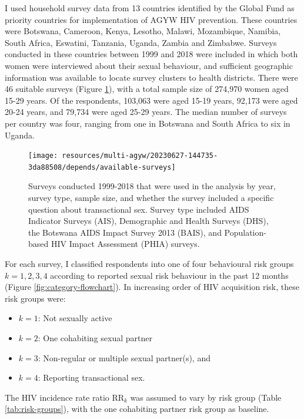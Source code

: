 \documentclass[a4paper, nobind]{templates/ociamthesis}
\providecommand{\tightlist}{%
  \setlength{\itemsep}{0pt}\setlength{\parskip}{0pt}}
\begin{document}
I used household survey data from 13 countries identified by the Global Fund \autocite{global2018measurement} as priority countries for implementation of AGYW HIV prevention.
These countries were Botswana, Cameroon, Kenya, Lesotho, Malawi, Mozambique, Namibia, South Africa, Eswatini, Tanzania, Uganda, Zambia and Zimbabwe.
Surveys conducted in these countries between 1999 and 2018 were included in which both women were interviewed about their sexual behaviour, and sufficient geographic information was available to locate survey clusters to health districts.
There were 46 suitable surveys (Figure \ref{fig:available-surveys}), with a total sample size of 274,970 women aged 15-29 years.
Of the respondents, 103,063 were aged 15-19 years, 92,173 were aged 20-24 years, and 79,734 were aged 25-29 years.
The median number of surveys per country was four, ranging from one in Botswana and South Africa to six in Uganda.



\begin{figure}
\texttt{[image: resources/multi-agyw/20230627-144735-3da88508/depends/available-surveys]} \caption{Surveys conducted 1999-2018 that were used in the analysis by year, survey type, sample size, and whether the survey included a specific question about transactional sex. Survey type included AIDS Indicator Surveys (AIS), Demographic and Health Surveys (DHS), the Botswana AIDS Impact Survey 2013 (BAIS), and Population-based HIV Impact Assessment (PHIA) surveys.}\label{fig:available-surveys}
\end{figure}

For each survey, I classified respondents into one of four behavioural risk groups \(k = 1, 2, 3, 4\) according to reported sexual risk behaviour in the past 12 months (Figure \ref{fig:category-flowchart}).
In increasing order of HIV acquisition risk, these risk groups were:

\begin{itemize}
\tightlist
\item
  \(k = 1\): Not sexually active
\item
  \(k = 2\): One cohabiting sexual partner
\item
  \(k = 3\): Non-regular or multiple sexual partner(s), and
\item
  \(k = 4\): Reporting transactional sex.
\end{itemize}

The HIV incidence rate ratio \(\text{RR}_k\) was assumed to vary by risk group (Table \ref{tab:risk-groups}), with the one cohabiting partner risk group as baseline.
\end{document}
